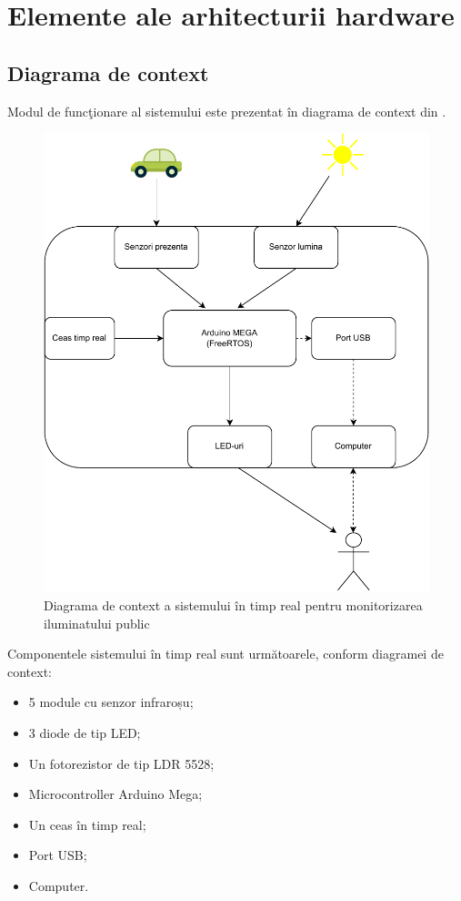 \chapter{Elemente ale arhitecturii hardware}
\label{chap:hard}

\section{Diagrama de context}

Modul de func\c{t}ionare al sistemului este prezentat \^{i}n diagrama de context din   .

\begin{figure}[!ht]
    \begin{center}
    \includegraphics[width=0.7\linewidth,keepaspectratio]{pics/diag_context.drawio.pdf}
    \end{center}
    \caption{Diagrama de context a sistemului în timp real pentru monitorizarea iluminatului public}
    \label{fig:diag.context}
\end{figure}

Componentele sistemului \^{i}n timp real sunt urm\u{a}toarele, conform diagramei de context:

\begin{itemize}
  \item 5 module cu senzor infraroșu; 
\item 3 diode de tip LED;     
 \item Un fotorezistor de tip LDR 5528;
\item  Microcontroller Arduino Mega;
\item  Un ceas în timp real;
\item  Port USB; 
\item Computer.
\end{itemize}

